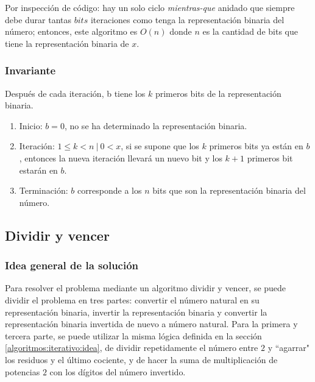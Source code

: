 \documentclass[letter]{article}
\begin{document}
Por inspección de código: hay un solo ciclo {\it mientras-que} anidado que siempre debe durar tantas $bits$ iteraciones como tenga la representación binaria del número; entonces, este algoritmo es $O(n)$ donde $n$ es la cantidad de bits que tiene la representación binaria de $x$.

\subsubsection{Invariante} \label{algoritmos:iterativo:invariante}

Después de cada iteración, b tiene los $k$ primeros bits de la representación binaria. \par

\begin{enumerate}
    \item Inicio: $b = 0$, no se ha determinado la representación binaria.
    \item Iteración: $1 \le k < n ~|~ 0 < x$, si se supone que los $k$ primeros bits ya están en $b$, entonces la nueva iteración llevará un nuevo bit y los $k+1$ primeros bit estarán en $b$.
    \item Terminación: $b$ corresponde a los $n$ bits que son la representación binaria del número.
\end{enumerate}

\subsection{Dividir y vencer} \label{algoritmos:dividir}

\subsubsection{Idea general de la solución} \label{algoritmos:dividir:idea}

Para resolver el problema mediante un algoritmo dividir y vencer, se puede dividir el problema en tres partes: convertir el número natural en su representación binaria, invertir la representación binaria y convertir la representación binaria invertida de nuevo a número natural. Para la primera y tercera parte, se puede utilizar la misma lógica definida en la sección \ref{algoritmos:iterativo:idea}, de dividir repetidamente el número entre $2$ y ``agarrar" los residuos y el último cociente, y de hacer la suma de multiplicación de potencias $2$ con los dígitos del número invertido. \par
\end{document}
